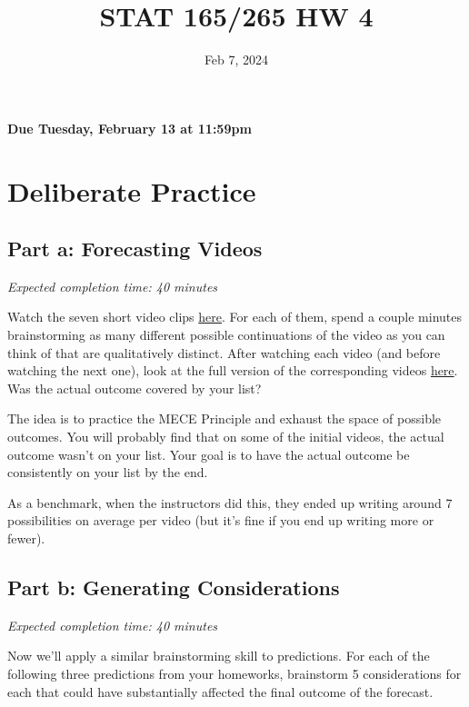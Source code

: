 \documentclass[11pt]{article}
\title{STAT 165/265 HW 4}
\date{Feb 7, 2024}
\begin{document}
\maketitle

\hfill \textbf{Due Tuesday, February 13 at 11:59pm}

\section*{Deliberate Practice}

\subsection*{Part a: Forecasting Videos}

\emph{Expected completion time: 40 minutes}

Watch the seven short video clips \href{http://www.forecastingclass.com/assets/initial_clips.zip}{here}. For each of them, spend a couple minutes brainstorming as many different 
possible continuations of the video as you can think of that are qualitatively distinct. After watching each video (and before watching the next one), look at the 
full version of the corresponding videos \href{http://www.forecastingclass.com/assets/full_videos.zip}{here}. Was the actual outcome covered by your list?

The idea is to practice the MECE Principle and exhaust the space of possible outcomes. You will probably find that on some of the initial videos, the actual outcome wasn't on your list. 
Your goal is to have the actual outcome be consistently on your list by the end.

As a benchmark, when the instructors did this, they ended up writing around 7 possibilities on average per video (but it's fine if you end up writing more or fewer).


\subsection*{Part b: Generating Considerations}

\emph{Expected completion time: 40 minutes}

Now we'll apply a similar brainstorming skill to predictions. 
For each of the following three predictions from your homeworks, brainstorm 5 considerations for each that could have substantially affected the final outcome of the forecast.
\end{document}
